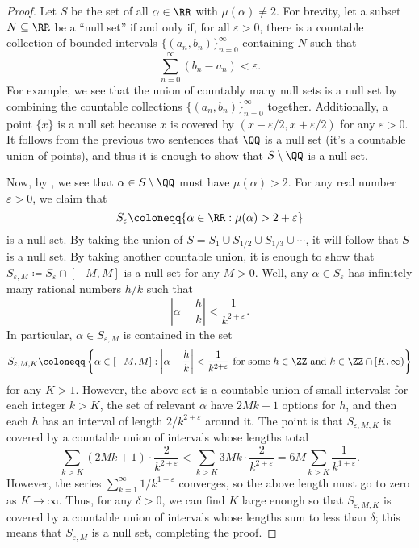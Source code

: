 \documentclass[../notes.tex]{subfiles}
\begin{document}
\begin{proof}
	Let $S$ be the set of all $\alpha\in\RR$ with $\mu(\alpha)\ne2$. For brevity, let a subset $N\subseteq\RR$ be a ``null set'' if and only if, for all $\varepsilon>0$, there is a countable collection of bounded intervals $\{(a_n,b_n)\}_{n=0}^\infty$ containing $N$ such that
	\[\sum_{n=0}^\infty(b_n-a_n)<\varepsilon.\]
	For example, we see that the union of countably many null sets is a null set by combining the countable collections $\{(a_n,b_n)\}_{n=0}^\infty$ together. Additionally, a point $\{x\}$ is a null set because $x$ is covered by $(x-\varepsilon/2,x+\varepsilon/2)$ for any $\varepsilon>0$. It follows from the previous two sentences that $\QQ$ is a null set (it's a countable union of points), and thus it is enough to show that $S\setminus\QQ$ is a null set.

	Now, by , we see that $\alpha\in S\setminus\QQ$ must have $\mu(\alpha)>2$. For any real number $\varepsilon>0$, we claim that
	\[S_\varepsilon\coloneqq\{\alpha\in\RR:\mu(\alpha)>2+\varepsilon\}\]
	is a null set. By taking the union of $S=S_1\cup S_{1/2}\cup S_{1/3}\cup\cdots$, it will follow that $S$ is a null set. By taking another countable union, it is enough to show that $S_{\varepsilon,M}\coloneqq S_\varepsilon\cap[-M,M]$ is a null set for any $M>0$. Well, any $\alpha\in S_\varepsilon$ has infinitely many rational numbers $h/k$ such that
	\[\left|\alpha-\frac hk\right|<\frac1{k^{2+\varepsilon}}.\]
	In particular, $\alpha\in S_{\varepsilon,M}$ is contained in the set
	\[S_{\varepsilon,M,K}\coloneqq\left\{\alpha\in[-M,M]:\left|\alpha-\frac hk\right|<\frac1{k^{2+\varepsilon}}\text{ for some }h\in\ZZ\text{ and }k\in\ZZ\cap[K,\infty)\right\}\]
	for any $K>1$. However, the above set is a countable union of small intervals: for each integer $k>K$, the set of relevant $\alpha$ have $2Mk+1$ options for $h$, and then each $h$ has an interval of length $2/k^{2+\varepsilon}$ around it. The point is that $S_{\varepsilon,M,K}$ is covered by a countable union of intervals whose lengths total
	\[\sum_{k>K}(2Mk+1)\cdot\frac2{k^{2+\varepsilon}}<\sum_{k>K}3Mk\cdot\frac2{k^{2+\varepsilon}}=6M\sum_{k>K}\frac1{k^{1+\varepsilon}}.\]
	However, the series $\sum_{k=1}^\infty1/k^{1+\varepsilon}$ converges, so the above length must go to zero as $K\to\infty$. Thus, for any $\delta>0$, we can find $K$ large enough so that $S_{\varepsilon,M,K}$ is covered by a countable union of intervals whose lengths sum to less than $\delta$; this means that $S_{\varepsilon,M}$ is a null set, completing the proof.
\end{proof}
\end{document}
